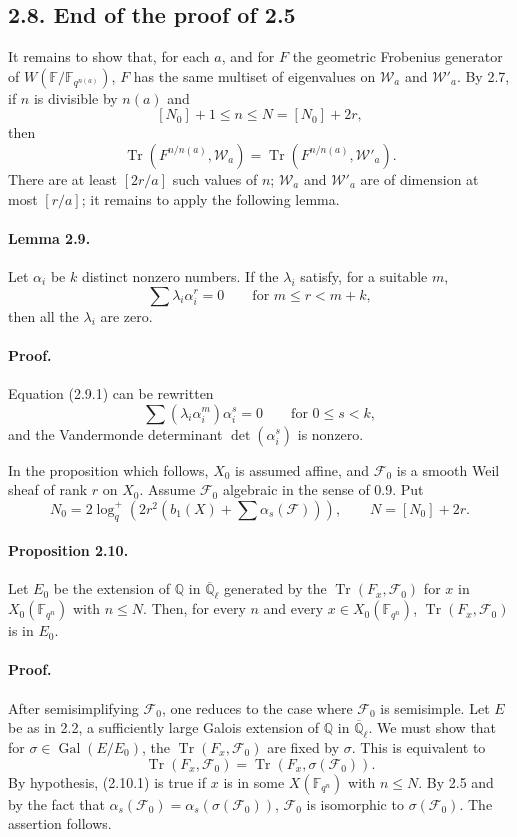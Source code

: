 \documentclass[11pt]{article}
\newcommand{\F}{\mathbb{F}}
\newcommand{\Q}{\mathbb{Q}}
\newcommand{\Ql}{\overline{\mathbb Q}_{\ell}}
\newcommand{\Tr}{\operatorname{Tr}}
\newcommand{\Gal}{\operatorname{Gal}}
\begin{document}
\subsection*{2.8. End of the proof of 2.5}
It remains to show that, for each $a$, and for $F$ the geometric Frobenius generator of $W(\F/\F_{q^{n(a)}})$, $F$ has the same multiset of eigenvalues on $\mathcal W_a$ and $\mathcal W'_a$.
By 2.7, if $n$ is divisible by $n(a)$ and
\[
 [N_0]+1\le n\le N=[N_0]+2r,
\]
then
\[
 \Tr(F^{n/n(a)},\mathcal W_a)=\Tr(F^{n/n(a)},\mathcal W'_a).
\]
There are at least $[2r/a]$ such values of $n$; $\mathcal W_a$ and $\mathcal W'_a$ are of dimension at most $[r/a]$; it remains to apply the following lemma.

\paragraph{Lemma 2.9.}
Let $\alpha_i$ be $k$ distinct nonzero numbers.
If the $\lambda_i$ satisfy, for a suitable $m$,
\begin{equation}
 \sum\lambda_i\alpha_i^r=0\qquad\text{for }m\le r<m+k,
\tag{2.9.1}
\end{equation}
then all the $\lambda_i$ are zero.

\paragraph{Proof.}
Equation (2.9.1) can be rewritten
\[
 \sum(\lambda_i\alpha_i^m)\alpha_i^s=0\qquad\text{for }0\le s<k,
\]
and the Vandermonde determinant $\det(\alpha_i^s)$ is nonzero.

In the proposition which follows, $X_0$ is assumed affine, and $\mathcal F_0$ is a smooth Weil sheaf of rank $r$ on $X_0$.
Assume $\mathcal F_0$ algebraic in the sense of 0.9.
Put
\[
 N_0=2\log_q^+\left(2r^2\left(b_1(X)+\sum\alpha_s(\mathcal F)\right)\right),\qquad
 N=[N_0]+2r.
\]

\paragraph{Proposition 2.10.}
Let $E_0$ be the extension of $\Q$ in $\Ql$ generated by the $\Tr(F_x,\mathcal F_0)$ for $x$ in $X_0(\F_{q^n})$ with $n\le N$.
Then, for every $n$ and every $x\in X_0(\F_{q^n})$, $\Tr(F_x,\mathcal F_0)$ is in $E_0$.

\paragraph{Proof.}
After semisimplifying $\mathcal F_0$, one reduces to the case where $\mathcal F_0$ is semisimple.
Let $E$ be as in 2.2, a sufficiently large Galois extension of $\Q$ in $\Ql$.
We must show that for $\sigma\in\Gal(E/E_0)$, the $\Tr(F_x,\mathcal F_0)$ are fixed by $\sigma$.
This is equivalent to
\begin{equation}
 \Tr(F_x,\mathcal F_0)=\Tr(F_x,\sigma(\mathcal F_0)).
\tag{2.10.1}
\end{equation}
By hypothesis, (2.10.1) is true if $x$ is in some $X(\F_{q^n})$ with $n\le N$.
By 2.5 and by the fact that $\alpha_s(\mathcal F_0)=\alpha_s(\sigma(\mathcal F_0))$, $\mathcal F_0$ is isomorphic to $\sigma(\mathcal F_0)$.
The assertion follows.
\end{document}
